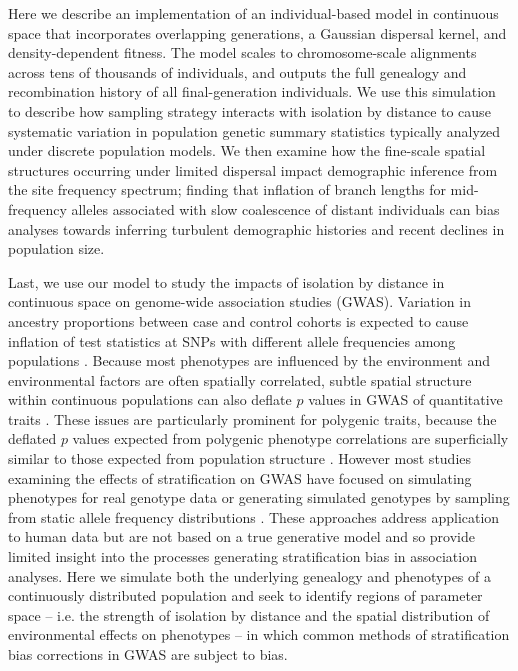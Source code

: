\documentclass[9pt,twocolumn,twoside,lineno]{gsajnl}
\begin{document}
Here we describe an implementation of an individual-based model in continuous space that incorporates overlapping generations, a Gaussian dispersal kernel, and density-dependent fitness. The model scales to chromosome-scale alignments across tens of thousands of individuals, and outputs the full genealogy and recombination history of all final-generation individuals. We use this simulation to describe how sampling strategy interacts with isolation by distance to cause systematic variation in population genetic summary statistics typically analyzed under discrete population models. We then examine how the fine-scale spatial structures occurring under limited dispersal impact demographic inference from the site frequency spectrum; finding that inflation of branch lengths for mid-frequency alleles associated with slow coalescence of distant individuals can bias analyses towards inferring turbulent demographic histories and recent declines in population size. 

Last, we use our model to study the impacts of isolation by distance in continuous space on genome-wide association studies (GWAS). Variation in ancestry proportions between case and control cohorts is expected to cause inflation of test statistics at SNPs with different allele frequencies among populations \citep{Price2006}. Because most phenotypes are influenced by the environment and environmental factors are often spatially correlated, subtle spatial structure within continuous populations can also deflate $p$ values in GWAS of quantitative traits \citep{Mathieson2012}. These issues are particularly prominent for polygenic traits, because the deflated $p$ values expected from polygenic phenotype correlations are superficially similar to those expected from population structure \citep{Bulik-Sullivan2015,Young2018}. However most studies examining the effects of stratification on GWAS have focused on simulating phenotypes for real genotype data \citep{Price2006,Bulik-Sullivan2015} or generating simulated genotypes by sampling from static allele frequency distributions \citep{Bulik-Sullivan2015,Heckerman2016}. These approaches address application to human data but are not based on a true generative model and so provide limited insight into the processes generating stratification bias in association analyses. Here we simulate both the underlying genealogy and phenotypes of a continuously distributed population and seek to identify regions of parameter space -- i.e. the strength of isolation by distance and the spatial distribution of environmental effects on phenotypes -- in which common methods of stratification bias corrections in GWAS are subject to bias. 
\end{document}
